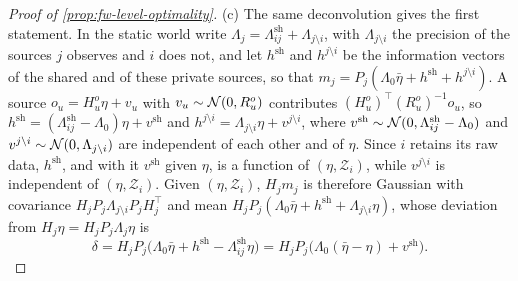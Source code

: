 \begin{proof}[Proof of \cref{prop:fw-level-optimality}]
(c) The same deconvolution gives the first statement. In the static world write $\Lambda_j=\Lambda^{\mathrm{sh}}_{ij}+\Lambda_{j\setminus i}$, with $\Lambda_{j\setminus i}$ the precision of the sources $j$ observes and $i$ does not, and let $h^{\mathrm{sh}}$ and $h^{j\setminus i}$ be the information vectors of the shared and of these private sources, so that $m_j=P_j(\Lambda_0\bar\eta+h^{\mathrm{sh}}+h^{j\setminus i})$. A source $o_u=H^o_u\eta+v_u$ with $v_u\sim\mathcal{N}(0,R^o_u)$ contributes $(H^o_u)^\top(R^o_u)^{-1}o_u$, so $h^{\mathrm{sh}}=(\Lambda^{\mathrm{sh}}_{ij}-\Lambda_0)\eta+v^{\mathrm{sh}}$ and $h^{j\setminus i}=\Lambda_{j\setminus i}\eta+v^{j\setminus i}$, where $v^{\mathrm{sh}}\sim\mathcal{N}(0,\Lambda^{\mathrm{sh}}_{ij}-\Lambda_0)$ and $v^{j\setminus i}\sim\mathcal{N}(0,\Lambda_{j\setminus i})$ are independent of each other and of $\eta$. Since $i$ retains its raw data, $h^{\mathrm{sh}}$, and with it $v^{\mathrm{sh}}$ given $\eta$, is a function of $(\eta,\mathcal Z_i)$, while $v^{j\setminus i}$ is independent of $(\eta,\mathcal Z_i)$. Given $(\eta,\mathcal Z_i)$, $H_jm_j$ is therefore Gaussian with covariance $H_jP_j\Lambda_{j\setminus i}P_jH_j^\top$ and mean $H_jP_j(\Lambda_0\bar\eta+h^{\mathrm{sh}}+\Lambda_{j\setminus i}\eta)$, whose deviation from $H_j\eta=H_jP_j\Lambda_j\eta$ is
\[
\delta=H_jP_j\bigl(\Lambda_0\bar\eta+h^{\mathrm{sh}}-\Lambda^{\mathrm{sh}}_{ij}\eta\bigr)=H_jP_j\bigl(\Lambda_0(\bar\eta-\eta)+v^{\mathrm{sh}}\bigr).
\]

\end{proof}
